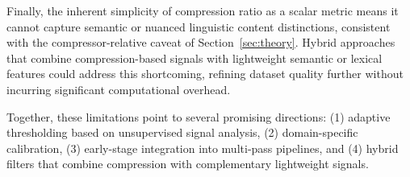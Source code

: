 Finally, the inherent simplicity of compression ratio as a scalar metric means it cannot capture semantic or nuanced linguistic content distinctions, consistent with the compressor-relative caveat of Section~\ref{sec:theory}.
Hybrid approaches that combine compression-based signals with lightweight semantic or lexical features could address this shortcoming, refining dataset quality further without incurring significant computational overhead.

Together, these limitations point to several promising directions: (1) adaptive thresholding based on unsupervised signal analysis, (2) domain-specific calibration, (3) early-stage integration into multi-pass pipelines, and (4) hybrid filters that combine compression with complementary lightweight signals.
